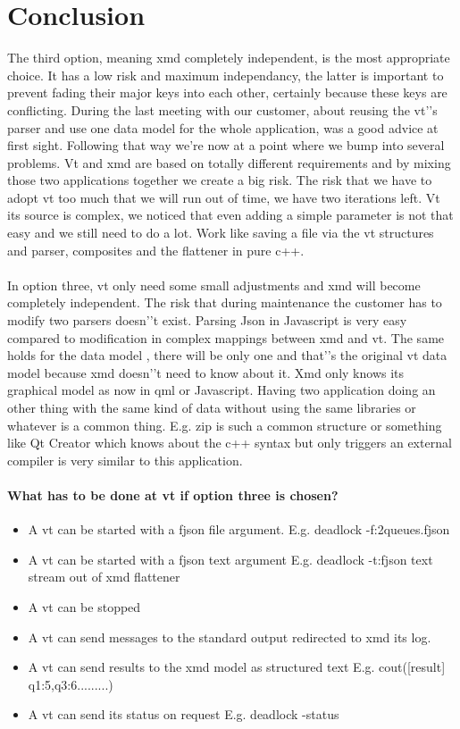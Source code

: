 \documentclass[a4paper,11pt,final]{article}
\begin{document}
\section{Conclusion}
The third option, meaning xmd completely independent, is the most
appropriate choice. It has a low risk and maximum independancy,
the latter is important to prevent fading their major keys into
each other, certainly because these keys are conflicting.
During the last meeting with our customer, about reusing
the vt'’s parser and use one data model for the whole application,
was a good advice at first sight. Following that way we're
now at a point where we bump into several problems.
Vt and xmd are based on totally different requirements and by mixing
those two applications together we create a big risk. The risk
that we have to adopt vt too much that we will run out of time, we
have two iterations left.
Vt its source is complex, we noticed that even adding a simple parameter 
is not that easy and we still need to do a lot. Work like saving a file via
the vt structures and parser, composites and the flattener in pure c++.

\paragraph{}

In option three, vt only need some small adjustments and xmd will become
completely independent.
The risk that during maintenance the customer has to modify two
parsers doesn'’t exist. Parsing Json in Javascript is very easy compared
to modification in complex mappings between xmd and vt.
The same holds for the data model , there will be only one and that'’s the
original vt data model because xmd doesn'’t need to know about it.
Xmd only knows its graphical model as now in qml or Javascript.
Having two application doing an other thing with the same kind of data
without using the same libraries or whatever is a common thing.
E.g. zip is such a common structure or something like Qt Creator
which knows about the c++ syntax but only triggers an external
compiler is very similar to this application.

\paragraph{What has to be done at vt if option three is chosen?}
\begin{itemize}
\item A vt can be started with a fjson file argument.
		E.g. deadlock -f:2queues.fjson
\item A vt can be started with a fjson text argument
		E.g. deadlock -t:{fjson text stream out of xmd flattener}
\item A vt can be stopped
\item A vt can send messages to the standard output redirected to xmd its log.
\item A vt can send results to the xmd model as structured text
		E.g. cout([result] q1:5,q3:6.........)
\item A vt can send its status on request E.g. deadlock -status
\end{itemize}
\end{document}

